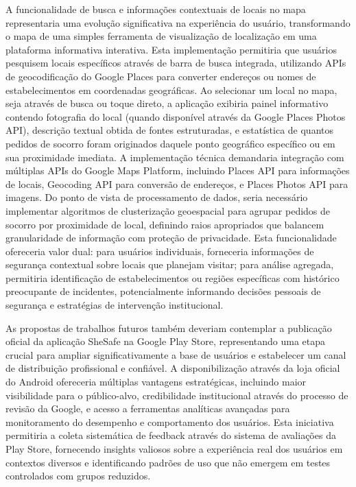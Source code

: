 A funcionalidade de busca e informações contextuais de locais no mapa representaria uma evolução significativa na experiência do usuário, transformando o mapa de uma simples ferramenta de visualização de localização em uma plataforma informativa interativa. Esta implementação permitiria que usuários pesquisem locais específicos através de barra de busca integrada, utilizando APIs de geocodificação do Google Places para converter endereços ou nomes de estabelecimentos em coordenadas geográficas. Ao selecionar um local no mapa, seja através de busca ou toque direto, a aplicação exibiria painel informativo contendo fotografia do local (quando disponível através da Google Places Photos API), descrição textual obtida de fontes estruturadas, e estatística de quantos pedidos de socorro foram originados daquele ponto geográfico específico ou em sua proximidade imediata. A implementação técnica demandaria integração com múltiplas APIs do Google Maps Platform, incluindo Places API para informações de locais, Geocoding API para conversão de endereços, e Places Photos API para imagens. Do ponto de vista de processamento de dados, seria necessário implementar algoritmos de clusterização geoespacial para agrupar pedidos de socorro por proximidade de local, definindo raios apropriados que balancem granularidade de informação com proteção de privacidade. Esta funcionalidade ofereceria valor dual: para usuários individuais, forneceria informações de segurança contextual sobre locais que planejam visitar; para análise agregada, permitiria identificação de estabelecimentos ou regiões específicas com histórico preocupante de incidentes, potencialmente informando decisões pessoais de segurança e estratégias de intervenção institucional.

As propostas de trabalhos futuros também deveriam contemplar a publicação oficial da aplicação SheSafe na Google Play Store, representando uma etapa crucial para ampliar significativamente a base de usuários e estabelecer um canal de distribuição profissional e confiável. A disponibilização através da loja oficial do Android ofereceria múltiplas vantagens estratégicas, incluindo maior visibilidade para o público-alvo, credibilidade institucional através do processo de revisão da Google, e acesso a ferramentas analíticas avançadas para monitoramento do desempenho e comportamento dos usuários. Esta iniciativa permitiria a coleta sistemática de feedback através do sistema de avaliações da Play Store, fornecendo insights valiosos sobre a experiência real dos usuários em contextos diversos e identificando padrões de uso que não emergem em testes controlados com grupos reduzidos.

